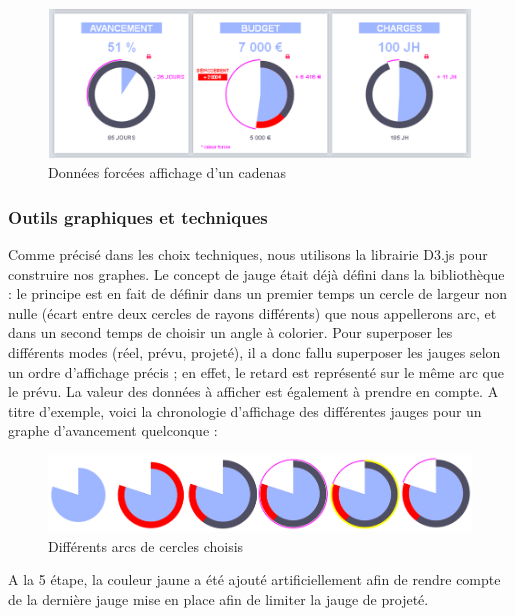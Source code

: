\documentclass[12pt]{report}
\begin{document}
\begin{figure}[H]
	\centering
	\includegraphics[width=1\textwidth]{pictures/clement/c7.png}
	\caption{Données forcées affichage d'un cadenas}
	\label{c7}
\end{figure}

	\subsubsection{Outils graphiques et techniques}
	
	Comme précisé dans les choix techniques, nous utilisons la librairie D3.js pour construire nos graphes. Le concept de jauge était déjà défini dans la bibliothèque : le principe est en fait de définir dans un premier temps un cercle de largeur non nulle (écart entre deux cercles de rayons différents) que nous appellerons arc, et dans un second temps de choisir un angle à colorier. Pour superposer les différents modes (réel, prévu, projeté), il a donc fallu superposer les jauges selon un ordre d’affichage précis ; en effet, le retard est représenté sur le même arc que le prévu. La valeur des données à afficher est également à prendre en compte. A titre d’exemple, voici la chronologie d’affichage des différentes jauges pour un graphe d’avancement quelconque :\\
	
	\begin{figure}[H]
	\centering
	\includegraphics[width=1\textwidth]{pictures/clement/c8.png}
	\caption{Différents arcs de cercles choisis}
	\label{c8}
\end{figure}

A la 5 étape, la couleur jaune a été ajouté artificiellement afin de rendre compte de la dernière jauge mise en place afin de limiter la jauge de projeté.
\end{document}
